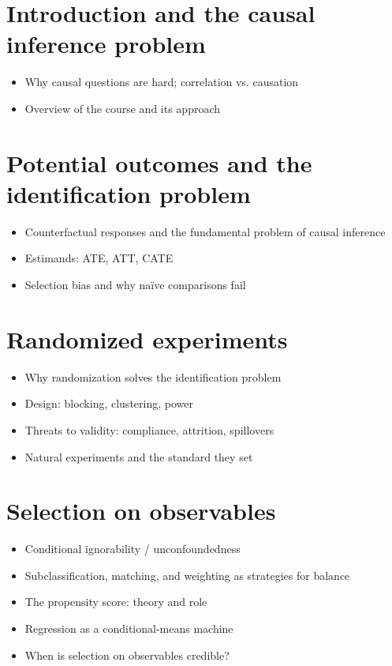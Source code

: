 \documentclass[PS]{syllabus}
\begin{document}
\begin{syllabus}
\section{Introduction and the causal inference problem}
\begin{itemize}
\item Why causal questions are hard; correlation vs. causation
\item Overview of the course and its approach
\end{itemize}

\section{Potential outcomes and the identification problem}
\begin{itemize}
\item Counterfactual responses and the fundamental problem of causal inference
\item Estimands: ATE, ATT, CATE
\item Selection bias and why na\"ive comparisons fail
\end{itemize}

\section{Randomized experiments}
\begin{itemize}
\item Why randomization solves the identification problem
\item Design: blocking, clustering, power
\item Threats to validity: compliance, attrition, spillovers
\item Natural experiments and the standard they set
\end{itemize}

\section{Selection on observables}
\begin{itemize}
\item Conditional ignorability / unconfoundedness
\item Subclassification, matching, and weighting as strategies for balance
\item The propensity score: theory and role
\item Regression as a conditional-means machine
\item When is selection on observables credible?
\end{itemize}


\end{syllabus}
\end{document}
